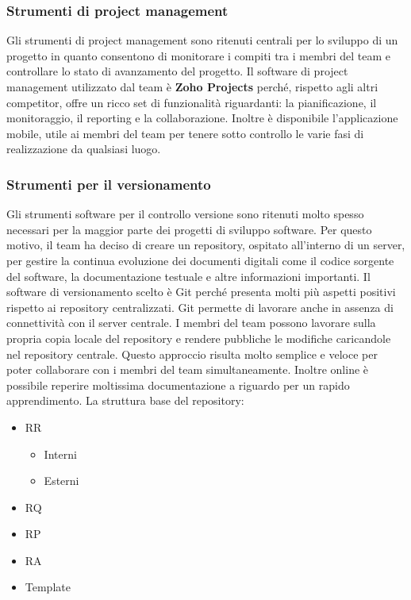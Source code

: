 \subsubsection{Strumenti di project management}
Gli strumenti di project management sono ritenuti centrali per lo sviluppo di un progetto in quanto consentono di monitorare i compiti tra i membri del team e controllare lo stato di avanzamento del progetto.
Il software di project management utilizzato dal team è \textbf{Zoho Projects} perché, rispetto agli altri competitor, offre un ricco set di funzionalità riguardanti: la pianificazione, il monitoraggio, il reporting e la collaborazione.
Inoltre è disponibile l'applicazione mobile, utile ai membri del team per tenere sotto controllo le varie fasi di realizzazione da qualsiasi luogo.

\subsubsection{Strumenti per il versionamento}
Gli strumenti software per il controllo versione sono ritenuti molto spesso necessari per la maggior parte dei progetti di sviluppo software.
Per questo motivo, il team ha deciso di creare un repository, ospitato all'interno di un server, per gestire la continua evoluzione dei documenti digitali come il codice sorgente del software, la documentazione testuale e altre informazioni importanti.
Il software di versionamento scelto è Git perché presenta molti più aspetti positivi rispetto ai repository centralizzati. Git permette di lavorare anche in assenza di connettività con il server centrale. I membri del team possono lavorare sulla propria copia locale del repository e rendere pubbliche le modifiche caricandole nel repository centrale. Questo approccio risulta molto semplice e veloce per poter collaborare con i membri del team simultaneamente.
Inoltre online è possibile reperire moltissima documentazione a riguardo per un rapido apprendimento. La struttura base del repository:
\begin{itemize}
  \item
	RR
	\begin{itemize}
		\item
			Interni
		\item
			Esterni
	\end{itemize}
  \item
    RQ
  \item
    RP
  \item
  	RA
  \item
  	Template 
\end{itemize}  

